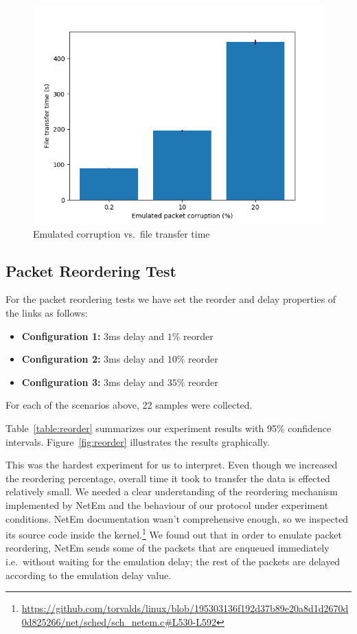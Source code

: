\documentclass[conference]{IEEEtran}
\begin{document}
\begin{figure}
    \centering
    \includegraphics[scale=0.6]{graphics/plot-corruption}
    \caption{Emulated corruption vs.\ file transfer time}\label{fig:corruption}
\end{figure}

\subsection{Packet Reordering Test}\label{AA}

For the packet reordering tests we have set the reorder and delay properties of the links as follows:
\begin{itemize}
    \item \textbf{Configuration 1:} 3ms delay and $1\%$ reorder
    \item \textbf{Configuration 2:} 3ms delay and $10\%$ reorder
    \item \textbf{Configuration 3:} 3ms delay and $35\%$ reorder
\end{itemize}
For each of the scenarios above, 22 samples were collected.

Table~\ref{table:reorder} summarizes our experiment results with 95\% confidence intervals.
Figure~\ref{fig:reorder} illustrates the results graphically.

This was the hardest experiment for us to interpret.
Even though we increased the reordering percentage, overall time it took to transfer the data is effected relatively small.
We needed a clear understanding of the reordering mechanism implemented by NetEm
and the behaviour of our protocol under experiment conditions.
NetEm documentation wasn't comprehensive enough, so we inspected its source code
inside the kernel.\footnote{\url{https://github.com/torvalds/linux/blob/195303136f192d37b89e20a8d1d2670d0d825266/net/sched/sch_netem.c#L530-L592}}
We found out that in order to emulate packet reordering, NetEm sends some of the packets
that are enqueued immediately i.e.\ without waiting for the emulation delay;
the rest of the packets are delayed according to the emulation delay value.
\end{document}
